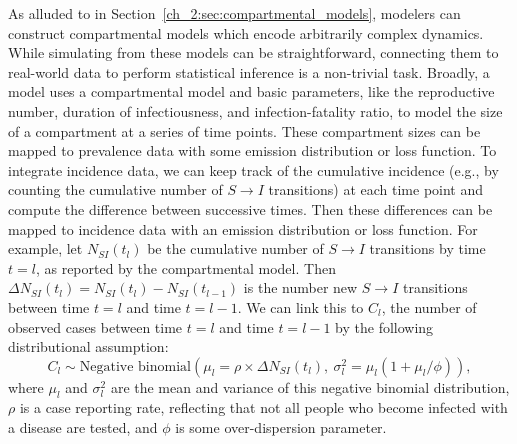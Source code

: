 As alluded to in Section~\ref{ch_2:sec:compartmental_models}, modelers can construct compartmental models which encode arbitrarily complex dynamics.
While simulating from these models can be straightforward, connecting them to real-world data to perform statistical inference is a non-trivial task.
Broadly, a model uses a compartmental model and basic parameters, like the reproductive number, duration of infectiousness, and infection-fatality ratio, to model the size of a compartment at a series of time points.
These compartment sizes can be mapped to prevalence data with some emission distribution or loss function.
To integrate incidence data, we can keep track of the cumulative incidence (e.g., by counting the cumulative number of \( S \to I \) transitions) at each time point and compute the difference between successive times.
Then these differences can be mapped to incidence data with an emission distribution or loss function.
For example, let \( N_{S I}(t_l) \) be the cumulative number of \( S \to I \) transitions by time \( t = l \), as reported by the compartmental model.
Then \( \Delta N_{S I}(t_l) = N_{S I}(t_l) - N_{S I}(t_{l-1}) \) is the number new \( S \to I \) transitions between time \( t = l \) and time \( t = l - 1 \).
We can link this to \( C_l \), the number of observed cases between time \( t = l \) and time \( t = l - 1 \) by the following distributional assumption:
\begin{equation}
C_l \sim \text{Negative binomial}\left (\mu_l =  \rho \times \Delta N_{S I}(t_l),\ {\sigma^2_l} = \mu_l (1 + \mu_l / \phi )\right ),
\label{ch_2:eqn:example_case_emission}
\end{equation}
where \( \mu_l \) and \( \sigma^2_l \) are the mean and variance of this negative binomial distribution, \( \rho \) is a case reporting rate, reflecting that not all people who become infected with a disease are tested, and \( \phi \) is some over-dispersion parameter.

